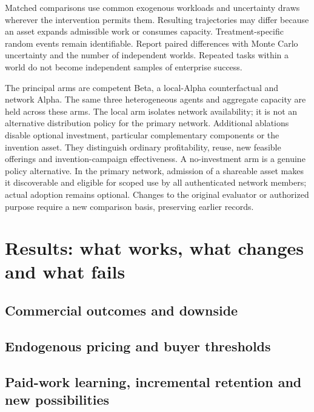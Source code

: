 \documentclass[11pt,a4paper]{article}
\begin{document}
\ResultProtocol


Matched comparisons use common exogenous workloads and uncertainty draws wherever the intervention permits them. Resulting trajectories may differ because an asset expands admissible work or consumes capacity. Treatment-specific random events remain identifiable. Report paired differences with Monte Carlo uncertainty and the number of independent worlds. Repeated tasks within a world do not become independent samples of enterprise success.

The principal arms are competent Beta, a local-Alpha counterfactual and network Alpha. The same three heterogeneous agents and aggregate capacity are held across these arms. The local arm isolates network availability; it is not an alternative distribution policy for the primary network. Additional ablations disable optional investment, particular complementary components or the invention asset. They distinguish ordinary profitability, reuse, new feasible offerings and invention-campaign effectiveness. A no-investment arm is a genuine policy alternative. In the primary network, admission of a shareable asset makes it discoverable and eligible for scoped use by all authenticated network members; actual adoption remains optional. Changes to the original evaluator or authorized purpose require a new comparison basis, preserving earlier records.

\section{Results: what works, what changes and what fails}

\subsection{Commercial outcomes and downside}
\ResultMainResults

\ResultEconomicsFigure
\ResultProfitFigure

\subsection{Endogenous pricing and buyer thresholds}
\ResultPricing

\ResultPricingFigure

\subsection{Paid-work learning, incremental retention and new possibilities}
\ResultInvestment
\ResultNewOpportunities


\ResultInvestmentFigure
\ResultCashFigure
\end{document}
